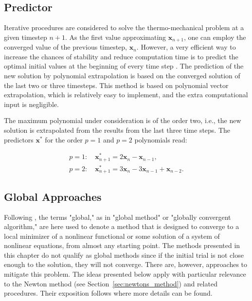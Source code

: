 \subsection{Predictor} \label{sec:predictor}

Iterative procedures are considered to solve the thermo-mechanical problem at a given timestep \(n+1\).
As the first value approximating \(\mathbf x_{n+1}\), one can employ the converged value of the previous timestep, \(\mathbf x_n\).
However, a very efficient way to increase the chances of stability and reduce computation time is to predict the optimal initial values at the beginning of every time step \citep{erbts_accelerated_2012, erbts_partitioned_2015, wendt_partitioned_2015}.
The prediction of the new solution by polynomial extrapolation is based on the converged solution of the last two or three timesteps.
This method is based on polynomial vector extrapolation, which is relatively easy to implement, and the extra computational input is negligible.

The maximum polynomial under consideration is of the order two, i.e., the new solution is extrapolated from the results from the last three time steps.
The predictors $\mathbf{x}^{*}$ for the order $p=1$ and $p=2$ polynomials read:
\begin{highlight}[innertopmargin=-5pt]
\begin{gather}
p=1:\quad \mathbf{x}_{n+1}^{*}=2 \mathbf{x}_{n}-\mathbf{x}_{n-1}, \\
p=2:\quad \mathbf{x}_{n+1}^{*}=3 \mathbf{x}_{n}-3 \mathbf{x}_{n-1}+\mathbf{x}_{n-2}.
\end{gather}
\end{highlight}

\subsection{Global Approaches}

Following \cite{dennis_numerical_1996}, the terms "global," as in "global method" or "globally convergent algorithm," are here used to denote a method that is designed to converge to a local minimizer of a nonlinear functional or some solution of a system of nonlinear equations, from almost any starting point.
The methods presented in this chapter do not qualify as global methods since if the initial trial is not close enough to the solution, they will not converge.
There are, however, approaches to mitigate this problem.
The ideas presented below apply with particular relevance to the Newton method (see Section~\ref{sec:newtons_method}) and related procedures.
Their exposition follows \cite{dennis_numerical_1996} where more details can be found.

